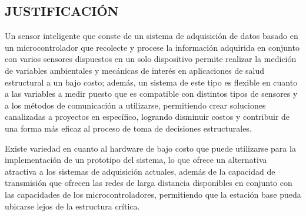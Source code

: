 \documentclass[12pt,letterpaper]{article}
\begin{document}



\newpage


\begin{center}
	\section*{JUSTIFICACIÓN}
\end{center}

\vspace{1cm}


Un sensor inteligente que conste de un sistema de adquisición de datos basado en un microcontrolador que recolecte y procese la información adquirida en conjunto con varios sensores dispuestos en un solo dispositivo permite realizar la medición de variables ambientales y mecánicas de interés en aplicaciones de salud estructural a un bajo costo; además, un sistema de este tipo es flexible en cuanto a las variables a medir puesto que es compatible con distintos tipos de sensores y a los métodos de comunicación a utilizarse, permitiendo crear soluciones canalizadas a proyectos en específico, logrando disminuir costos y contribuir de una forma más eficaz al proceso de toma de decisiones estructurales.

Existe variedad en cuanto al hardware de bajo costo que puede utilizarse para la implementación de un prototipo del sistema, lo que ofrece un alternativa atractiva a los sistemas de adquisición actuales, además de la capacidad de transmisión que ofrecen las redes de larga distancia disponibles en conjunto con las capacidades de los microcontroladores, permitiendo que la estación base pueda ubicarse lejos de la estructura crítica.
\end{document}
